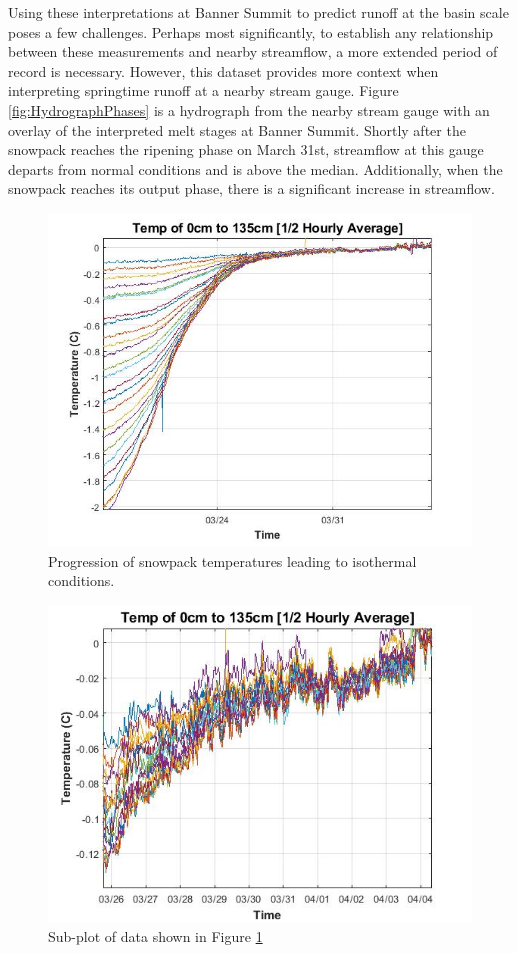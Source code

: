 Using these interpretations at Banner Summit to predict runoff at the basin scale poses a few challenges.  Perhaps most significantly, to establish any relationship between these measurements and nearby streamflow, a more extended period of record is necessary. However, this dataset provides more context when interpreting springtime runoff at a nearby stream gauge. Figure \ref{fig:HydrographPhases} is a hydrograph from the nearby stream gauge with an overlay of the interpreted melt stages at Banner Summit. Shortly after the snowpack reaches the ripening phase on March 31st, streamflow at this gauge departs from normal conditions and is above the median. Additionally, when the snowpack reaches its output phase, there is a significant increase in streamflow.

\begin{figure}
    \centering
    \includegraphics[width=0.7\linewidth]{figures/0_135cm_Isothermal.jpg}
    \caption{Progression of snowpack temperatures leading to isothermal conditions.}
    \label{fig:0_135cm_Isothermal}
 \end{figure}
 
 \begin{figure}
    \centering
    \includegraphics[width=0.7\linewidth]{figures/0_135cm_zoom.jpg}
    \caption{Sub-plot of data shown in Figure \ref{fig:0_135cm_Isothermal}}
    \label{fig:0_135cm_Zoom}
 \end{figure}
 
